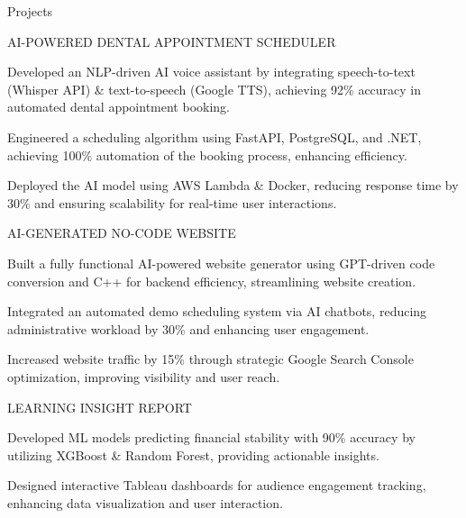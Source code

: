 \documentclass{resume} %
\begin{document}
    \begin{rSection}{Projects}
                    \begin{rSubsection}
                                    {AI{-}POWERED DENTAL APPOINTMENT SCHEDULER}
                                {}{}{}
                                    \item Developed an NLP{-}driven AI voice assistant by integrating speech{-}to{-}text (Whisper API) \& text{-}to{-}speech (Google TTS), achieving 92\% accuracy in automated dental appointment booking.
                                    \item Engineered a scheduling algorithm using FastAPI, PostgreSQL, and .NET, achieving 100\% automation of the booking process, enhancing efficiency.
                                    \item Deployed the AI model using AWS Lambda \& Docker, reducing response time by 30\% and ensuring scalability for real{-}time user interactions.
                            \end{rSubsection}
                    \begin{rSubsection}
                                    {AI{-}GENERATED NO{-}CODE WEBSITE}
                                {}{}{}
                                    \item Built a fully functional AI{-}powered website generator using GPT{-}driven code conversion and C++ for backend efficiency, streamlining website creation.
                                    \item Integrated an automated demo scheduling system via AI chatbots, reducing administrative workload by 30\% and enhancing user engagement.
                                    \item Increased website traffic by 15\% through strategic Google Search Console optimization, improving visibility and user reach.
                            \end{rSubsection}
                    \begin{rSubsection}
                                    {LEARNING INSIGHT REPORT}
                                {}{}{}
                                    \item Developed ML models predicting financial stability with 90\% accuracy by utilizing XGBoost \& Random Forest, providing actionable insights.
                                    \item Designed interactive Tableau dashboards for audience engagement tracking, enhancing data visualization and user interaction.

\end{rSubsection}
\end{rSection}
\end{document}
